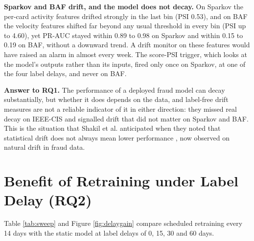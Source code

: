 \textbf{Sparkov and BAF drift, and the model does not decay.} On Sparkov the per-card activity features drifted strongly in the last bin (PSI 0.53), and on BAF the velocity features shifted far beyond any usual threshold in every bin (PSI up to 4.60), yet PR-AUC stayed within 0.89 to 0.98 on Sparkov and within 0.15 to 0.19 on BAF, without a downward trend. A drift monitor on these features would have raised an alarm in almost every week. The score-PSI trigger, which looks at the model's outputs rather than its inputs, fired only once on Sparkov, at one of the four label delays, and never on BAF.

\textbf{Answer to RQ1.} The performance of a deployed fraud model can decay substantially, but whether it does depends on the data, and label-free drift measures are not a reliable indicator of it in either direction: they missed real decay on IEEE-CIS and signalled drift that did not matter on Sparkov and BAF. This is the situation that Shakil et al. anticipated when they noted that statistical drift does not always mean lower performance \cite{shakil2025}, now observed on natural drift in fraud data.

\section{Benefit of Retraining under Label Delay (RQ2)}

Table \ref{tab:sweep} and Figure \ref{fig:delaygain} compare scheduled retraining every 14 days with the static model at label delays of 0, 15, 30 and 60 days.

